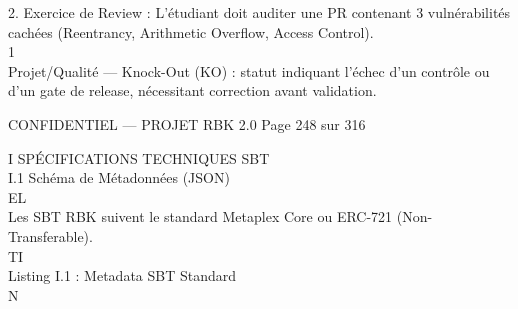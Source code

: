 \documentclass[12pt,landscape,a4paper]{article}
\newenvironment{confidential}
{\begin{tcolorbox}[
    colback=rbkred!5!white,
    colframe=rbkred!75!black,
    title=CONFIDENTIEL,
    fonttitle=\bfseries\color{white},
    coltitle=rbkred!75!black,
    breakable,
    enhanced,
    frame hidden,
    borderline west={2pt}{0pt}{rbkred!75!black}
]}
{\end{tcolorbox}}
\begin{document}
\vspace{0.5em}
2. Exercice de Review : L’étudiant doit auditer une PR contenant 3 vulnérabilités cachées (Reentrancy, Arithmetic Overflow, Access Control).\\
\vspace{0.5em}
\vspace{0.5em}
\vspace{0.5em}
\vspace{0.5em}
1\\
Projet/Qualité — Knock-Out (KO) : statut indiquant l’échec d’un contrôle ou d’un gate de release, nécessitant correction avant validation.\\
\vspace{0.5em}
\vspace{0.5em}
\begin{confidential}CONFIDENTIEL — PROJET RBK 2.0                                              Page 248 sur 316\end{confidential}
I \textbar{} SPÉCIFICATIONS TECHNIQUES SBT\\
\vspace{0.5em}
\vspace{0.5em}
I.1 Schéma de Métadonnées (JSON)\\
\vspace{0.5em}
\vspace{0.5em}
\vspace{0.5em}
\vspace{0.5em}
EL\\
Les SBT RBK suivent le standard Metaplex Core ou ERC-721 (Non-Transferable).\\
\vspace{0.5em}
\vspace{0.5em}
\vspace{0.5em}
\vspace{0.5em}
TI\\
Listing I.1 : Metadata SBT Standard\\
\vspace{0.5em}
\vspace{0.5em}
\vspace{0.5em}
\vspace{0.5em}
N\\
\end{document}
